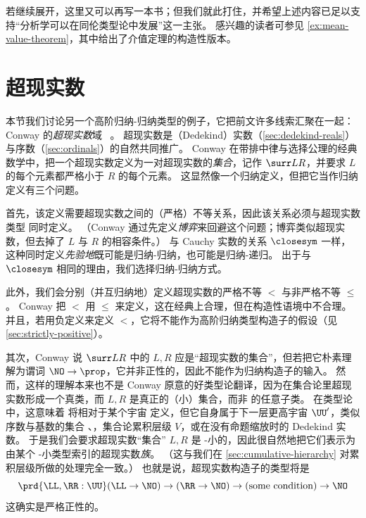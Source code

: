 若继续展开，这里又可以再写一本书；但我们就此打住，并希望上述内容已足以支持“分析学可以在同伦类型论中发展”这一主张。
感兴趣的读者可参见 \cref{ex:mean-value-theorem}，其中给出了介值定理的构造性版本。


%
%
\section{超现实数}
\label{sec:surreals}

%

本节我们讨论另一个高阶归纳-归纳类型的例子，它把前文许多线索汇聚在一起：Conway 的\emph{超现实数}域 \NO~\cite{conway:onag}。
超现实数是（Dedekind）实数（\cref{sec:dedekind-reals}）与序数（\cref{sec:ordinals}）的自然共同推广。
Conway 在带排中律与选择公理的经典数学中，把一个超现实数定义为一对超现实数的\emph{集合}，记作 $\surr L R$，并要求 $L$ 的每个元素都严格小于 $R$ 的每个元素。
这显然像一个归纳定义，但把它当作归纳定义有三个问题。

首先，该定义需要超现实数之间的（严格）不等关系，因此该关系必须与超现实数类型 \NO 同时定义。
（Conway 通过先定义\emph{博弈}来回避这个问题；博弈类似超现实数，但去掉了 $L$ 与 $R$ 的相容条件。）
与 Cauchy 实数的关系 $\closesym$ 一样，这种同时定义\emph{先验地}既可能是归纳-归纳，也可能是归纳-递归。
出于与 $\closesym$ 相同的理由，我们选择归纳-归纳方式。

此外，我们会分别（并互归纳地）定义超现实数的严格不等 $<$ 与非严格不等 $\le$。
Conway 把 $<$ 用 $\le$ 来定义，这在经典上合理，但在构造性语境中不合理。
%
并且，若用负定义来定义 $<$，它将不能作为高阶归纳类型构造子的假设（见 \cref{sec:strictly-positive}）。

其次，Conway 说 $\surr L R$ 中的 $L,R$ 应是“超现实数的集合”，但若把它朴素理解为谓词 $\NO\to\prop$，它并非正性的，因此不能作为归纳构造子的输入。
然而，这样的理解本来也不是 Conway 原意的好类型论翻译，因为在集合论里超现实数形成一个真类，而 $L,R$ 是真正的（小）集合，而非 \NO 的任意子类。
在类型论中，这意味着 \NO 将相对于某个宇宙 \UU 定义，但它自身属于下一层更高宇宙 $\UU'$，类似序数与基数的集合 \ord、\card，集合论累积层级 $V$，或在没有命题缩放时的 Dedekind 实数。
%
于是我们会要求超现实数“集合” $L,R$ 是 \UU-小的，因此很自然地把它们表示为由某个 \UU-小类型索引的超现实数\emph{族}。
（这与我们在 \cref{sec:cumulative-hierarchy} 对累积层级所做的处理完全一致。）
也就是说，超现实数构造子的类型将是
\[ \prd{\LL,\RR:\UU} (\LL\to\NO) \to (\RR\to \NO) \to (\text{some condition}) \to \NO \]
这确实是严格正性的。

